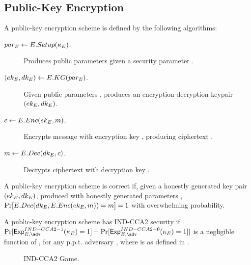 \subsection{Public-Key Encryption}
\label{sapp:pk-encryption}

A public-key encryption scheme is defined by the following algorithms:

\begin{description}
\item[$par_{E} \gets E.Setup(\kappa_{E})$.] Produces public parameters \Eparm given
  a security parameter \Esecpar.
\item[$(ek_{E},dk_{E}) \gets E.KG(par_{E})$.] Given public parameters \Eparm,
  produces an encryption-decryption keypair $(ek_{E},dk_{E})$.
\item[$c \gets E.Enc(ek_{E},m)$.] Encrypts message \msg with encryption key
  \Eek, producing ciphertext \Ec.
\item[$m \gets E.Dec(dk_{E},c)$.] Decrypts ciphertext \Ec with decryption key
  \Edk.
\end{description}

A public-key encryption scheme is correct if, given a honestly generated key
pair $(ek_{E},dk_{E})$, produced with honestly generated parameters \Eparm,
$\Pr[E.Dec(dk_{E},E.Enc(ek_{E},m))=m] = 1$ with overwhelming probability.

A public-key encryption scheme has IND-CCA2 security if
$\Pr[\ExpINDCCAiio(\Esecpar) = 1] - \Pr[\ExpINDCCAiiz(\Esecpar) = 1]|$ is
a negligible function of \Esecpar, for any p.p.t. adversary \adv, where
\ExpINDCCAiib is as defined in .

\begin{figure}[ht!]
  \label{fig:indcca2-game}
  \caption{IND-CCA2 Game.}
\end{figure}

